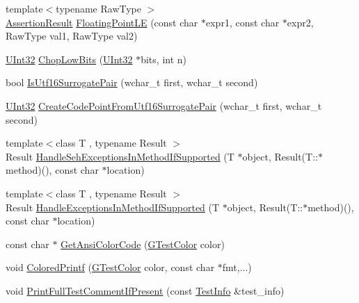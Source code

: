 \begin{DoxyCompactItemize}
\item 
{\footnotesize template$<$typename Raw\+Type $>$ }\\\hyperlink{classtesting_1_1_assertion_result}{Assertion\+Result} \hyperlink{namespacetesting_1_1internal_a17b52b6b1f81f6dcad5cc4d12e5173a6}{Floating\+Point\+LE} (const char $\ast$expr1, const char $\ast$expr2, Raw\+Type val1, Raw\+Type val2)
\item 
\hyperlink{namespacetesting_1_1internal_a40d4fffcd2bf56f18b1c380615aa85e3}{U\+Int32} \hyperlink{namespacetesting_1_1internal_a2c54b453387aa8a18f2f3e09f10b5a7d}{Chop\+Low\+Bits} (\hyperlink{namespacetesting_1_1internal_a40d4fffcd2bf56f18b1c380615aa85e3}{U\+Int32} $\ast$bits, int n)
\item 
bool \hyperlink{namespacetesting_1_1internal_a681895f8cc32286211be9889da107394}{Is\+Utf16\+Surrogate\+Pair} (wchar\+\_\+t first, wchar\+\_\+t second)
\item 
\hyperlink{namespacetesting_1_1internal_a40d4fffcd2bf56f18b1c380615aa85e3}{U\+Int32} \hyperlink{namespacetesting_1_1internal_ac8ef1bb10cd9e69de939789b759e6bc9}{Create\+Code\+Point\+From\+Utf16\+Surrogate\+Pair} (wchar\+\_\+t first, wchar\+\_\+t second)
\item 
{\footnotesize template$<$class T , typename Result $>$ }\\Result \hyperlink{namespacetesting_1_1internal_ac5293b438139ef7ed05cb7fcaaf63545}{Handle\+Seh\+Exceptions\+In\+Method\+If\+Supported} (T $\ast$object, Result(T\+::$\ast$method)(), const char $\ast$location)
\item 
{\footnotesize template$<$class T , typename Result $>$ }\\Result \hyperlink{namespacetesting_1_1internal_addb2ed165b92b74e25fe9ebe9e46b9f9}{Handle\+Exceptions\+In\+Method\+If\+Supported} (T $\ast$object, Result(T\+::$\ast$method)(), const char $\ast$location)
\item 
const char $\ast$ \hyperlink{namespacetesting_1_1internal_a0aefb9deb60e90f19c236559837303d8}{Get\+Ansi\+Color\+Code} (\hyperlink{namespacetesting_1_1internal_a648c1bc94c2ef9e868ff3f9dff0f9c4e}{G\+Test\+Color} color)
\item 
void \hyperlink{namespacetesting_1_1internal_adef3055706176001364e54eb73a87e31}{Colored\+Printf} (\hyperlink{namespacetesting_1_1internal_a648c1bc94c2ef9e868ff3f9dff0f9c4e}{G\+Test\+Color} color, const char $\ast$fmt,...)
\item 
void \hyperlink{namespacetesting_1_1internal_a7a85ebe3b4de93a1edb091f92f1fb393}{Print\+Full\+Test\+Comment\+If\+Present} (const \hyperlink{classtesting_1_1_test_info}{Test\+Info} \&test\+\_\+info)

\end{DoxyCompactItemize}
